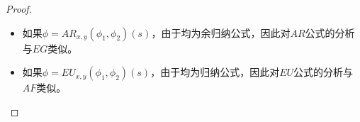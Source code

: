 {\begin{proof}
\begin{itemize}
\begin{itemize}
\begin{itemize}
				$\textsf{cpt}(\Gamma\vdash EG_x(\psi)(s), c_1, c_2) \rsa^*\\
				\textsf{cpt}(\vdash(s/x)\psi,
				\textsf{cpt}(\Gamma'\vdash EG_x(\psi)(s_1), c_1,\\
				\textsf{cpt}(...\textsf{cpt}( \Gamma'\vdash EG_x(\psi)(s_n), c_1, c_2)...)),\\
				c_2)\rsa^*\\
				\textsf{cpt}(\Gamma'\vdash EG_x(\psi)(s_1), c_1,
				\textsf{cpt}(...\textsf{cpt}(\Gamma'\vdash EG_x(\psi)(s_n), c_1, c_2)...))\rsa^*\\
				\ldots\rsa^*\\
				\textsf{cpt}(\Gamma'\vdash EG_x(\psi)(s_i), c_1,
				\textsf{cpt}(...\textsf{cpt}(\Gamma'\vdash EG_x(\psi)(s_n), c_1, c_2)...))\rsa^*c_1$。
			\end{itemize}
		\end{itemize}
		
		\item 如果$\phi = AR_{x,y}(\phi_1,\phi_2)(s)$，由于均为余归纳公式，因此对$AR$公式的分析与$EG$类似。
		\item 如果$\phi = EU_{x,y}(\phi_1,\phi_2)(s)$，由于均为归纳公式，因此对$EU$公式的分析与$AF$类似。
	\end{itemize}
	
\end{proof}
}
